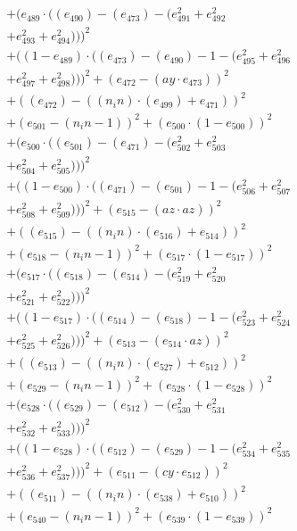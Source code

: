 \documentclass[10pt, a4paper]{article}
\begin{document}
\begin{align*}
& + (e_{489}  \cdot  ((e_{490}) - (e_{473}) - (e_{491}^{2} + e_{492}^{2} \\
& + e_{493}^{2} + e_{494}^{2})))^{2} \\
& + ((1 - e_{489})  \cdot  ((e_{473}) - (e_{490}) - 1 - (e_{495}^{2} + e_{496}^{2} \\
& + e_{497}^{2} + e_{498}^{2})))^{2} + (e_{472} - (ay  \cdot  e_{473}))^{2} \\
& + ((e_{472}) - ((n_in)  \cdot  (e_{499}) + e_{471}))^{2} \\
& + (e_{501} - (n_in - 1))^{2} + (e_{500}  \cdot  (1 - e_{500}))^{2} \\
& + (e_{500}  \cdot  ((e_{501}) - (e_{471}) - (e_{502}^{2} + e_{503}^{2} \\
& + e_{504}^{2} + e_{505}^{2})))^{2} \\
& + ((1 - e_{500})  \cdot  ((e_{471}) - (e_{501}) - 1 - (e_{506}^{2} + e_{507}^{2} \\
& + e_{508}^{2} + e_{509}^{2})))^{2} + (e_{515} - (az  \cdot  az))^{2} \\
& + ((e_{515}) - ((n_in)  \cdot  (e_{516}) + e_{514}))^{2} \\
& + (e_{518} - (n_in - 1))^{2} + (e_{517}  \cdot  (1 - e_{517}))^{2} \\
& + (e_{517}  \cdot  ((e_{518}) - (e_{514}) - (e_{519}^{2} + e_{520}^{2} \\
& + e_{521}^{2} + e_{522}^{2})))^{2} \\
& + ((1 - e_{517})  \cdot  ((e_{514}) - (e_{518}) - 1 - (e_{523}^{2} + e_{524}^{2} \\
& + e_{525}^{2} + e_{526}^{2})))^{2} + (e_{513} - (e_{514}  \cdot  az))^{2} \\
& + ((e_{513}) - ((n_in)  \cdot  (e_{527}) + e_{512}))^{2} \\
& + (e_{529} - (n_in - 1))^{2} + (e_{528}  \cdot  (1 - e_{528}))^{2} \\
& + (e_{528}  \cdot  ((e_{529}) - (e_{512}) - (e_{530}^{2} + e_{531}^{2} \\
& + e_{532}^{2} + e_{533}^{2})))^{2} \\
& + ((1 - e_{528})  \cdot  ((e_{512}) - (e_{529}) - 1 - (e_{534}^{2} + e_{535}^{2} \\
& + e_{536}^{2} + e_{537}^{2})))^{2} + (e_{511} - (cy  \cdot  e_{512}))^{2} \\
& + ((e_{511}) - ((n_in)  \cdot  (e_{538}) + e_{510}))^{2} \\
& + (e_{540} - (n_in - 1))^{2} + (e_{539}  \cdot  (1 - e_{539}))^{2} \\

\end{align*}
\end{document}
